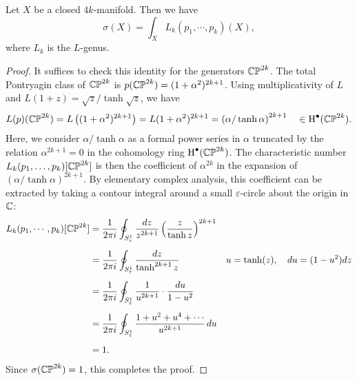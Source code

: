 \begin{theorem}[Hirzebruch]\label{thm:hirzebruch-signature-theorem}
	Let $X$ be a closed $4k$-manifold. Then we have
	\[
		\sigma(X) = \int_X L_k(p_1, \cdots, p_k)(X),
	\]
	where $L_k$ is the $L$-genus.
\end{theorem}
\begin{proof}
	It suffices to check this identity for the generators $\mathbb{CP}^{2k}$. The total Pontryagin class of $\mathbb{CP}^{2k}$ is $p(\mathbb{CP}^{2k})=(1+\alpha^2)^{2k+1}$. Using multiplicativity of $L$ and $L(1+z)=\sqrt{z}/\tanh\sqrt{z}$, we have
	\[
		\begin{aligned}
			L(p)(\mathbb{CP}^{2k})
			= L\left((1+\alpha^2)^{2k+1}\right)
			= L(1+\alpha^2)^{2k+1}
			= \left(\alpha/\tanh \alpha\right)^{2k+1}
			\quad\in\operatorname{H}^\bullet(\mathbb{CP}^{2k}).
		\end{aligned}
	\]
	Here, we consider $\alpha/\tanh \alpha$ as a formal power series in $\alpha$ truncated by the relation $\alpha^{2k+1}=0$ in the cohomology ring $\operatorname{H}^\bullet(\mathbb{CP}^{2k})$. The characteristic number $L_k(p_1,\ldots,p_k)[\mathbb{CP}^{2k}]$ is then the coefficient of $\alpha^{2k}$ in the expansion of $(\alpha/\tanh \alpha)^{2k+1}$.
	By elementary complex analysis, this coefficient can be extracted by taking a contour integral around a small $\varepsilon$-circle about the origin in $\mathbb{C}$:
	\[
		\begin{aligned}
			L_k(p_1,\cdots, p_k)[\mathbb{CP}^{2k}]
			 & = \frac{1}{2\pi i}\oint_{S^1_\varepsilon} \frac{dz}{z^{2k+1}} \left(\frac{z}{\tanh z}\right)^{2k+1}
			 &                                                                                                       \\[0.5em]
			 & = \frac{1}{2\pi i}\oint_{S^1_\varepsilon} \frac{dz}{\tanh^{2k+1} z}\quad
			 & u  =\tanh(z),\quad
			du =(1-u^2)dz
			\\[0.5em]
			 & = \frac{1}{2\pi i}\oint_{S^1_\varepsilon} \frac{1}{u^{2k+1}}\cdot\frac{du}{1-u^2}
			 &                                                                                                       \\[0.5em]
			 & = \frac{1}{2\pi i}\oint_{S^1_\varepsilon} \frac{1+u^2+u^4+\cdots}{u^{2k+1}}\,du                       \\[0.5em]
			 & =1.                                                                                                 &
		\end{aligned}
	\]
	Since $\sigma(\mathbb{CP}^{2k})=1$, this completes the proof.
\end{proof}

